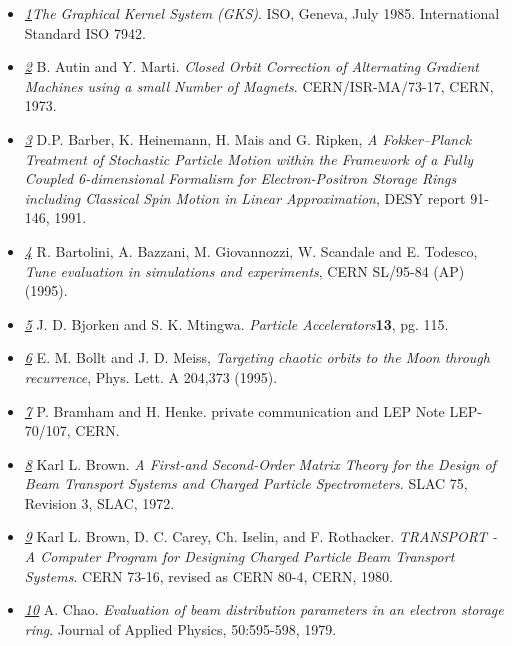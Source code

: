 \begin{itemize}
	\item \href{gks}{\textit{1}}\textit{The Graphical Kernel System (GKS)}. ISO, Geneva, July 1985. International Standard ISO 7942. 


	\item \href{autin}{\textit{2}} B. Autin and Y. Marti. \textit{Closed Orbit Correction of Alternating Gradient Machines   using a small Number of Magnets}. CERN/ISR-MA/73-17, CERN, 1973. 


	\item \href{barber}{\textit{3}} D.P. Barber, K. Heinemann, H. Mais and G. Ripken, \textit{A Fokker--Planck Treatment of Stochastic Particle Motion within   the Framework of a Fully Coupled 6-dimensional Formalism for   Electron-Positron Storage Rings including Classical Spin Motion in   Linear Approximation}, DESY report 91-146, 1991. 


	\item \href{bartolini}{\textit{4}} R. Bartolini, A. Bazzani, M. Giovannozzi, W. Scandale and E. Todesco, \textit{Tune evaluation in simulations and experiments}, CERN SL/95-84 (AP) (1995). 


	\item \href{bjorken}{\textit{5}} J. D. Bjorken and S. K. Mtingwa. \textit{Particle Accelerators}\textbf{13}, pg. 115. 


	\item \href{moon}{\textit{6}} E. M. Bollt and J. D. Meiss, \textit{Targeting chaotic orbits to the Moon through recurrence}, Phys. Lett. A 204,373 (1995). 


	\item \href{bramham}{\textit{7}} P. Bramham and H. Henke. private communication and LEP Note LEP-70/107, CERN. 


	\item \href{slac75}{\textit{8}} Karl L. Brown. \textit{A First-and Second-Order Matrix Theory for the Design   of Beam Transport Systems and Charged Particle Spectrometers}. SLAC 75, Revision 3, SLAC, 1972. 


	\item \href{transport}{\textit{9}} Karl L. Brown, D. C. Carey, Ch. Iselin, and F. Rothacker. \textit{TRANSPORT - A Computer Program for Designing Charged   Particle Beam Transport Systems}. CERN 73-16, revised as CERN 80-4, CERN, 1980. 


	\item \href{chao}{\textit{10}} A. Chao. \textit{Evaluation of beam distribution parameters in an electron   storage ring}. Journal of Applied Physics, 50:595-598, 1979. 



\end{itemize}
